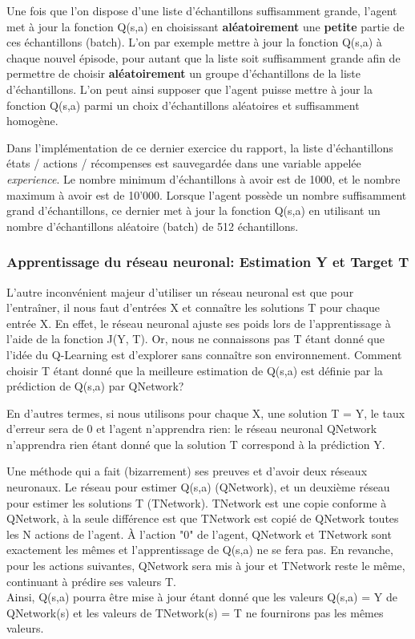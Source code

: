 \documentclass[11pt,a4paper]{report}
\begin{document}
  \par Une fois que l'on dispose d'une liste d'échantillons suffisamment grande, l'agent met à jour la fonction Q(s,a) en choisissant \textbf{aléatoirement} une \textbf{petite} partie de ces échantillons (batch). L'on par exemple mettre à jour la fonction Q(s,a) à chaque nouvel épisode, pour autant que la liste soit suffisamment grande afin de permettre de choisir \textbf{aléatoirement} un groupe d'échantillons de la liste d'échantillons. L'on peut ainsi supposer que l'agent puisse mettre à jour la fonction Q(s,a) parmi un choix d'échantillons aléatoires et suffisamment homogène. 
  
  \par Dans l'implémentation de ce dernier exercice du rapport, la liste d'échantillons états / actions / récompenses est sauvegardée dans une variable appelée \textit{experience}. Le nombre minimum d'échantillons à avoir est de 1000, et le nombre maximum à avoir est de 10'000. Lorsque l'agent possède un nombre suffisamment grand d'échantillons, ce dernier met à jour la fonction Q(s,a) en utilisant un nombre d'échantillons aléatoire (batch) de 512 échantillons. 
  
  \subsubsection{Apprentissage du réseau neuronal: Estimation Y et Target T}
  
    \par L'autre inconvénient majeur d'utiliser un réseau neuronal est que pour l’entraîner, il nous faut d'entrées X et connaître les solutions T pour chaque entrée X. En effet, le réseau neuronal ajuste ses poids lors de l'apprentissage à l'aide de la fonction J(Y, T). Or, nous ne connaissons pas T étant donné que l'idée du Q-Learning est d'explorer sans connaître son environnement. Comment choisir T étant donné que la meilleure estimation de Q(s,a) est définie par la prédiction de Q(s,a) par QNetwork? 
    
    \par En d'autres termes, si nous utilisons pour chaque X, une solution T = Y, le taux d'erreur sera de 0 et l'agent n'apprendra rien: le réseau neuronal QNetwork n'apprendra rien étant donné que la solution T correspond à la prédiction Y. 
    
    \par Une méthode qui a fait (bizarrement) ses preuves et d'avoir deux réseaux neuronaux. Le réseau pour estimer Q(s,a) (QNetwork), et un deuxième réseau pour estimer les solutions T (TNetwork). TNetwork est une copie conforme à QNetwork, à la seule différence est que TNetwork est copié de QNetwork toutes les N actions de l'agent. À l'action "0" de l'agent, QNetwork et TNetwork sont exactement les mêmes et l'apprentissage de Q(s,a) ne se fera pas. En revanche, pour les actions suivantes, QNetwork sera mis à jour et TNetwork reste le même, continuant à prédire ses valeurs T. \\
    Ainsi, Q(s,a) pourra être mise à jour étant donné que les valeurs Q(s,a) = Y de QNetwork(s) et les valeurs de TNetwork(s) = T ne fournirons pas les mêmes valeurs. 
    
\end{document}
